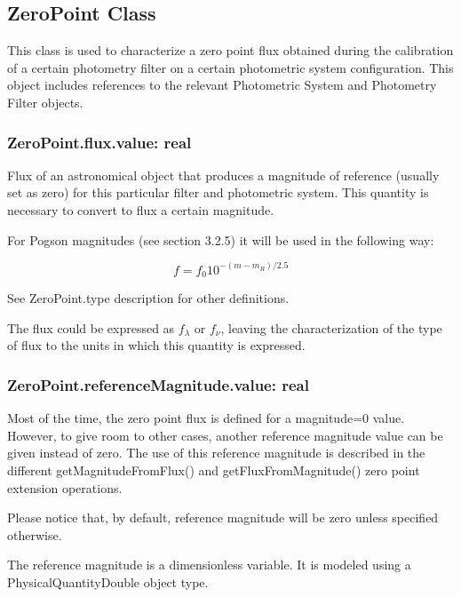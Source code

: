\documentclass[11pt,a4paper]{ivoa}
\begin{document}
\subsection{ZeroPoint Class}
This class is used to characterize a zero point flux obtained during the 
calibration of a certain photometry filter on a certain photometric system 
configuration. This object includes references to the relevant Photometric 
System and Photometry Filter objects.
\par

\subsubsection{ZeroPoint.flux.value: real}
Flux of an astronomical object that produces a magnitude of reference 
(usually set as zero) for this particular filter and photometric system. 
This quantity is necessary to convert to flux a certain magnitude.
\par

For Pogson magnitudes (see section 3.2.5) it will be used in the following way:
\par
\begin{equation} \label{eq:24}
f = f_0 10^{-(m-m_R )/2.5}
\end{equation}

See ZeroPoint.type description for other definitions.
\par

The flux could be expressed as $f_{\lambda}$ or $f_{\nu}$, leaving the 
characterization of the type of flux to the units in which this quantity 
is expressed.
\par

\subsubsection{ZeroPoint.referenceMagnitude.value: real}
Most of the time, the zero point flux is defined for a magnitude=0 value. 
However, to give room to other cases, another reference magnitude value can 
be given instead of zero. The use of this reference magnitude is described in 
the different getMagnitudeFromFlux() and getFluxFromMagnitude() zero point 
extension operations.
\par

Please notice that, by default, reference magnitude will be zero unless 
specified otherwise.
\par

The reference magnitude is a dimensionless variable. It is modeled using a 
PhysicalQuantityDouble object type.
\par
\end{document}
